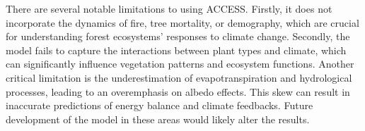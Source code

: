 \documentclass[]{article}
\begin{document}
%
%
%

There are several notable limitations to using ACCESS.
Firstly, it does not incorporate the dynamics of fire, tree mortality, or demography, which are crucial for understanding forest ecosystems' responses to climate change.
Secondly, the model fails to capture the interactions between plant types and climate, which can significantly influence vegetation patterns and ecosystem functions.
Another critical limitation is the underestimation of evapotranspiration and hydrological processes, leading to an overemphasis on albedo effects.
This skew can result in inaccurate predictions of energy balance and climate feedbacks.
Future development of the model in these areas would likely alter the results.
\end{document}
